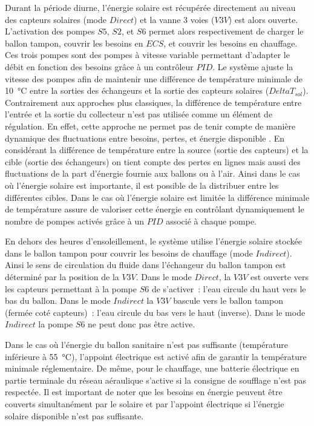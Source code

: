 Durant la période diurne, l’énergie solaire est récupérée directement au niveau des
capteurs solaires (mode $Direct$) et la vanne 3 voies ($V3V$) est alors ouverte. L’activation des
pompes $S5$, $S2$, et $S6$ permet alors respectivement de charger le ballon tampon,
couvrir les besoins en $ECS$, et couvrir les besoins en chauffage. Ces trois pompes
sont des pompes à vitesse variable permettant d’adapter le débit en fonction des besoins
grâce à un contrôleur $PID$. Le système ajuste la vitesse des pompes afin de maintenir une
différence de température minimale de \SI{10}{\celsius} entre la sorties des échangeurs et
la sortie des capteurs solaires ($DeltaT_{sol}$). Contrairement aux approches plus classiques, la différence de
température entre l’entrée et la sortie du collecteur n’est pas utilisée comme un élément
de régulation. En effet, cette approche ne permet pas de tenir compte de manière dynamique
des fluctuations entre besoins, pertes, et énergie disponible \parencite{Mosallat2013686}.
En considérant la différence de température entre la source (sortie des capteurs) et la
cible (sortie des échangeurs) on tient compte des pertes en lignes mais aussi des
fluctuations de la part d’énergie fournie aux ballons ou à l’air. Ainsi dans le cas où
l’énergie solaire est importante, il est possible de la distribuer
entre les différentes cibles. Dans le cas où l’énergie solaire est limitée la différence
minimale de température assure de valoriser cette énergie en contrôlant dynamiquement le
nombre de pompes activés grâce à un $PID$ associé à chaque pompe.

En dehors des heures d’ensoleillement, le système utilise l’énergie solaire stockée dans le
ballon tampon pour couvrir les besoins de chauffage (mode $Indirect$). Ainsi le sens de
circulation du fluide dans l’échangeur du ballon tampon est déterminé par la position de
la $V3V$. Dans le mode $Direct$, la $V3V$ est ouverte vers les capteurs
permettant à la pompe $S6$ de s’activer~: l’eau circule du haut vers le bas du ballon.
Dans le mode $Indirect$ la $V3V$ bascule vers le ballon tampon (fermée coté
capteurs)~: l’eau circule du bas vers le haut (inverse). Dans le mode $Indirect$ la pompe
$S6$ ne peut donc pas être active.

Dans le cas où l’énergie du ballon sanitaire n’est pas suffisante (température inférieure
à \SI{55}{\celsius}), l’appoint électrique est activé afin de garantir la température
minimale réglementaire. De même, pour le chauffage, une batterie électrique en partie
terminale du réseau aéraulique s’active si la consigne de soufflage n’est pas respectée. Il est important
de noter que les besoins en énergie peuvent être couverts simultanément par
le solaire et par l’appoint électrique si l’énergie solaire disponible n’est pas
suffisante.

